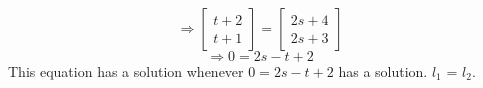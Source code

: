 \documentclass{article}
\begin{document}
$$\Longrightarrow \left[\begin{array}{c}
	t + 2 \\
	t + 1
	\end{array} \right ] = \left[\begin{array}{c}
	2s + 4 \\
	2s + 3
	\end{array} \right ] $$
$$\Longrightarrow 0 = 2s - t + 2 $$
This equation has a solution whenever $0 = 2s - t + 2 $ has a solution. $l_1$ = $l_2$. 
\end{document}

